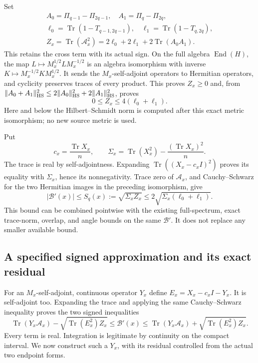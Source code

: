 Set
\[
 \begin{gathered}
 A_0=\Pi_{q-1}-\Pi_{2q-1},\quad
 A_1=\Pi_q-\Pi_{2q},\\
 \ell_0=\operatorname{Tr}(1-T_{q-1,2q-1}),\quad
 \ell_1=\operatorname{Tr}(1-T_{q,2q}),\\
 Z_x=\operatorname{Tr}(\mathcal A_x^2)
       =2\ell_0+2\ell_1+2\operatorname{Tr}(A_0A_1).
 \end{gathered}
 \tag{ISM23}
\]
This retains the cross term with its actual sign.
On the full algebra \(\operatorname{End}(H)\), the map
\(L\mapsto M_x^{1/2}LM_x^{-1/2}\) is an algebra
isomorphism with inverse \(K\mapsto M_x^{-1/2}KM_x^{1/2}\).
It sends the \(M_x\)-self-adjoint operators to Hermitian
operators, and cyclicity preserves traces of every
product.  This proves \(Z_x\geq0\) and, from
\(\|A_0+A_1\|_{\rm HS}^2\leq
2\|A_0\|_{\rm HS}^2+2\|A_1\|_{\rm HS}^2\), proves
\[
 0\leq Z_x\leq4(\ell_0+\ell_1).
 \tag{ISM24}
\]
Here and below the Hilbert--Schmidt norm is computed after
this exact metric isomorphism; no new source metric is used.

Put
\[
 c_x=\frac{\operatorname{Tr}X_x}{n},\qquad
 \Sigma_x=\operatorname{Tr}(X_x^2)
              -\frac{(\operatorname{Tr}X_x)^2}{n}.
 \tag{ISM25}
\]
The trace is real by self-adjointness.  Expanding
\(\operatorname{Tr}((X_x-c_xI)^2)\) proves its equality
with \(\Sigma_x\), hence its nonnegativity.
Trace zero of \(\mathcal A_x\), and Cauchy--Schwarz for
the two Hermitian images in the preceding isomorphism, give
\[
 |\mathcal B'(x)|
 \leq S_q(x):=\sqrt{\Sigma_xZ_x}
 \leq2\sqrt{\Sigma_x(\ell_0+\ell_1)}.
 \tag{ISM26}
\]
This bound can be combined pointwise with the existing
full-spectrum, exact trace-norm, overlap, and angle
bounds on the same \(\mathcal B'\).  It does not replace
any smaller available bound.

\subsection{A specified signed approximation and its exact residual}

For an \(M_x\)-self-adjoint, continuous operator \(Y_x\)
define \(E_x=X_x-c_xI-Y_x\).  It is self-adjoint too.
Expanding the trace and applying the same Cauchy--Schwarz
inequality proves the two signed inequalities
\[
 \operatorname{Tr}(Y_x\mathcal A_x)
       -\sqrt{\operatorname{Tr}(E_x^2)Z_x}
 \leq\mathcal B'(x)\leq
 \operatorname{Tr}(Y_x\mathcal A_x)
       +\sqrt{\operatorname{Tr}(E_x^2)Z_x}.
 \tag{ISM27}
\]
Every term is real.  Integration is legitimate by
continuity on the compact interval.  We now construct
such a \(Y_x\), with its residual controlled from the
actual two endpoint forms.

